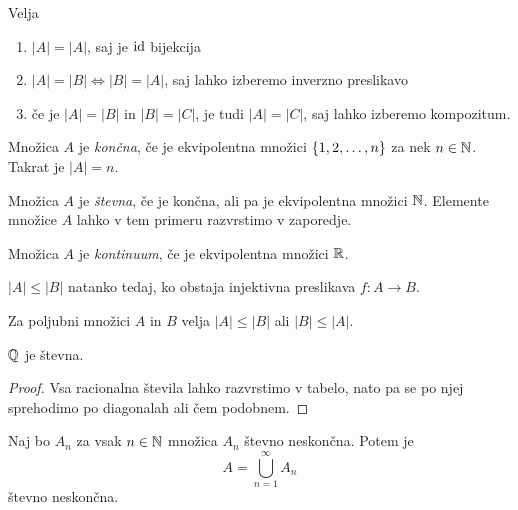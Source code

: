 \documentclass[12pt, a4paper]{article}
\begin{document}
\begin{opomba}
Velja

\begin{enumerate}[label=\arabic*)]
\item $|A|=|A|$, saj je $\operatorname{id}$ bijekcija
\item $|A|=|B|\iff |B|=|A|$, saj lahko izberemo inverzno preslikavo
\item če je $|A|=|B|$ in $|B|=|C|$, je tudi $|A|=|C|$, saj lahko izberemo kompozitum.
\end{enumerate}
\end{opomba}

\begin{definicija}
Množica $A$ je \emph{končna}, če je ekvipolentna množici $\left\{1,2,\dots,n\right\}$ za nek $n\in\mathbb{N}$. Takrat je $|A|=n$.
\end{definicija}

\begin{definicija}
Množica $A$ je \emph{števna}, če je končna, ali pa je ekvipolentna množici $\mathbb{N}$. Elemente množice $A$ lahko v tem primeru razvrstimo v zaporedje.
\end{definicija}

\begin{definicija}
Množica $A$ je \emph{kontinuum}, če je ekvipolentna množici $\mathbb{R}$.
\end{definicija}

\begin{definicija}
$|A|\leq |B|$ natanko tedaj, ko obstaja injektivna preslikava $f\colon A\to B$.
\end{definicija}

\begin{opomba}
Za poljubni množici $A$ in $B$ velja $|A|\leq |B|$ ali $|B|\leq |A|$.
\end{opomba}

\begin{izrek}
$\mathbb{Q}$ je števna.
\end{izrek}

\begin{proof}
Vsa racionalna števila lahko razvrstimo v tabelo, nato pa se po njej sprehodimo po diagonalah ali čem podobnem.
\end{proof}

\begin{izrek}
Naj bo $A_n$ za vsak $n\in\mathbb{N}$ množica $A_n$ števno neskončna. Potem je
\[
A=\bigcup_{n=1}^\infty A_n
\]
števno neskončna.
\end{izrek}
\end{document}
